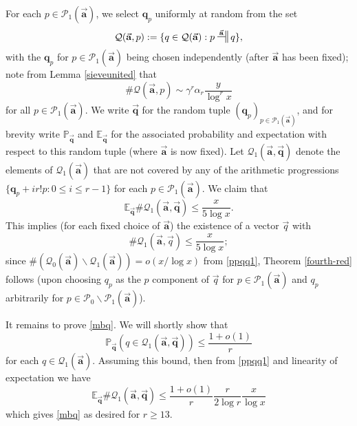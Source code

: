 \documentclass[12pt]{amsart}
\numberwithin{equation}{section}  %
\theoremstyle{remark}
\theoremstyle{plain}
\numberwithin{equation}{section}
\newcommand{\E}{\mathbb{E}}  %
\newcommand{\PR}{\mathbb{P}}  %
\renewcommand{\leq}{\leqslant}
\renewcommand{\geq}{\geqslant}
\renewcommand{\(}{\left(}
\renewcommand{\)}{\right)}
\newcommand{\asym}{\sim}   %
\newcommand{\relra}{\nsdtstile{}{\vect{\mathbf{a}}}} %
\newcommand{\vect}[1]{{\ensuremath{\vec{#1}}}}
\newcommand{\PP}{\mathcal{P}}
\newcommand{\QQ}{\mathcal{Q}}
\begin{document}
For each $p \in \PP_1(\vect{\mathbf{a}})$, we select $\mathbf{q}_p$ uniformly at random from the set
\begin{equation}\label{Bp-def}
\QQ(\vect{\mathbf{a}}, p) := \{ q \in \QQ(\vect{\mathbf{a}}): p \relra q \}, 
\end{equation}
with the $\mathbf{q}_p$ for $p \in \PP_1(\vect{\mathbf{a}})$ being chosen independently (after $\vect{\mathbf{a}}$ has been fixed); note from Lemma \ref{sieveunited} that
\begin{equation}\label{Bp-size}
\# \QQ(\vect{\mathbf{a}}, p) \asym \gamma^r\alpha_r\frac y{\log^r x}
\end{equation}
for all $p \in \PP_1(\vect{\mathbf{a}})$.  We write
$\vect{\mathbf{q}}$ for the random tuple $(\mathbf{q}_p)_{p \in
  \PP_1(\vect{\mathbf{a}}) }$, and for brevity write
 $\PR_\vect{\mathbf{q}}$ and $\E_\vect{\mathbf{q}}$ for the associated 
probability and expectation with respect to this random tuple 
(where $\vect{\mathbf{a}}$ is now fixed).
  Let $\QQ_1(\vect{\mathbf{a}}, \vect{\mathbf{q}})$ denote the elements of $\QQ_1(\vect{\mathbf{a}})$ that are not covered by any of the arithmetic progressions $\{ \mathbf{q}_p + i r! p: 0 \leq i \leq r-1\}$ for each $p \in \PP_1(\vect{\mathbf{a}})$.  We claim that
\begin{equation}\label{mbq}
 \E_\vect{\mathbf{q}}  \# \QQ_1(\vect{\mathbf{a}}, \vect{\mathbf{q}}) \leq  \frac{x}{5\log x}.
\end{equation}
This implies (for each fixed choice of $\vect{\mathbf{a}}$) the existence of a vector $\vect{q}$ with
$$  \# \QQ_1(\vect{\mathbf{a}}, \vect{q}) \leq  \frac{x}{5\log x};$$
since $\# (\QQ_0(\vect{\mathbf{a}}) \backslash
\QQ_1(\vect{\mathbf{a}})) = o(x/\log x)$ from \eqref{ppqq1}, Theorem
\ref{fourth-red} follows (upon choosing 
$q_p$ as the $p$ component of $\vect{q}$ for  $p\in\PP_1(\vect{\mathbf{a}})$ and  $q_p$ arbitrarily for $p \in \PP_0 \backslash \PP_1(\vect{\mathbf{a}})$).

It remains to prove \eqref{mbq}.  We will shortly show that
\begin{equation}\label{pqr}
 \PR_\vect{\mathbf{q}} ( q \in \QQ_1(\vect{\mathbf{a}}, \vect{\mathbf{q}}) ) \leq \frac{1+o(1)}{r}
\end{equation}
for each $q \in \QQ_1(\vect{\mathbf{a}})$.  Assuming
this bound, then from \eqref{ppqq1} and linearity of expectation we
have
$$
 \E_\vect{\mathbf{q}}  \# \QQ_1(\vect{\mathbf{a}}, \vect{\mathbf{q}}) \leq \frac{1+o(1)}{r} \frac{r}{2\log r} \frac{x}{\log x}$$
which gives \eqref{mbq} as desired for $r \geq 13$.
\end{document}
